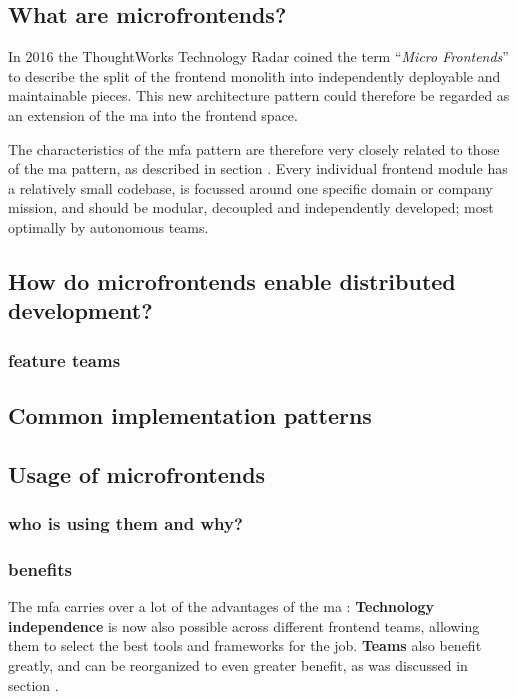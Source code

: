 \subsection{What are microfrontends?}

In 2016 the ThoughtWorks Technology Radar \autocite{ThoughtWorks_2020} coined
the term ``\textit{Micro Frontends}'' to describe the split of the
\gls{frontend} \gls{monolith} into independently deployable and maintainable
pieces. This new architecture pattern could therefore be regarded as an
extension of the \gls{ma} into the \gls{frontend} space.

The characteristics of the \gls{mfa} pattern are therefore very closely related
to those of the \gls{ma} pattern, as described in section
. Every individual \gls{frontend} module has a
relatively small codebase, is focussed around one specific domain or company
mission, and should be modular, decoupled and independently developed; most
optimally by autonomous teams.

\subsection{How do microfrontends enable distributed development?}



\subsubsection{feature teams}
\label{feature-teams}


\subsection{Common implementation patterns}


\subsection{Usage of microfrontends}

\subsubsection{who is using them and why?}

\subsubsection{benefits}

The \gls{mfa}  carries over a lot of the advantages of the \gls{ma}
\autocite{Jackson_2019}: \textbf{Technology independence} is now also possible
across different \gls{frontend} teams, allowing them to select the best tools
and frameworks for the job. \textbf{Teams} also benefit greatly, and can be
reorganized to even greater benefit, as was discussed in section
.

